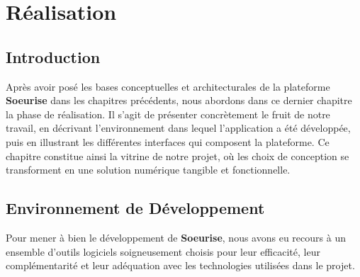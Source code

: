 \documentclass[12pt,a4paper]{report}
\begin{document}
	\chapter{Réalisation}
	
	
	
	\localtableofcontents
	\newpage
	
	\section{Introduction}
	
	Après avoir posé les bases conceptuelles et architecturales de la plateforme 
	\textbf{Soeurise} dans les chapitres précédents, nous abordons dans ce dernier 
	chapitre la phase de réalisation. Il s'agit de présenter concrètement le fruit 
	de notre travail, en décrivant l'environnement dans lequel l'application a été 
	développée, puis en illustrant les différentes interfaces qui composent la 
	plateforme. Ce chapitre constitue ainsi la vitrine de notre projet, où les 
	choix de conception se transforment en une solution numérique tangible et 
	fonctionnelle.
	
	\section{Environnement de Développement}
	
	Pour mener à bien le développement de \textbf{Soeurise}, nous avons eu 
	recours à un ensemble d'outils logiciels soigneusement choisis pour leur 
	efficacité, leur complémentarité et leur adéquation avec les technologies 
	utilisées dans le projet.
	
\end{document}
